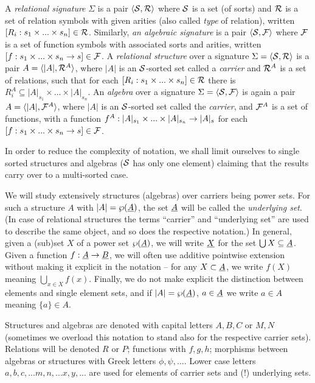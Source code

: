 \documentclass[10pt]{article}
\begin{document}
A {\em relational signature\/}
$\Sigma$ is a pair $\langle{\cal S},{\cal R} \rangle$ where ${\cal S}$ is a set (of sorts)
and ${\cal R}$ is a set of relation symbols with given arities (also called
{\em type} of relation), written
$[R_i:s_1\times...\times s_n]\in {\cal R}$. Similarly, {\em an algebraic
signature\/} is a pair $\langle{\cal S},{\cal F} \rangle$ where 
${\cal F}$ is a set of function symbols with associated sorts and arities,
written $[f:s_1\times...\times s_n\rightarrow s]\in {\cal F}$. 
A {\em relational structure\/} over a signature $\Sigma=\langle{\cal S},{\cal R}\rangle$
is a pair $A= \langle|A|, {\cal R}^A\rangle$, where $|A|$ is
an ${\cal S}$-sorted set called a {\em carrier\/} and ${\cal R}^A$ is a set of
relations, such that for each $[R_i : s_1\times...\times s_n]\in {\cal R}$
there is $R_i^A \subseteq |A|_{s_1}\times...\times |A|_{s_n}$. 
An {\em algebra\/} over a signature $\Sigma=\langle{\cal S},{\cal F}\rangle$ 
is again a pair $A= \langle|A|, {\cal F}^A\rangle$, where $|A|$ is
an ${\cal S}$-sorted set called the {\em carrier}, and ${\cal F}^A$ is a set of
functions, with a function $f^A : |A|_{s_1}\times...\times |A|_{s_n} \rightarrow
|A|_s$ for each $[f : s_1\times...\times s_n\rightarrow s]\in {\cal F}$.

In order to reduce the complexity of notation, we shall limit
ourselves to single sorted structures and algebras 
(${\cal S}$ has only  one element)
claiming that the results carry over to a multi-sorted case. 


We will study extensively structures (algebras) over carriers being
power sets. 
For such a structure $A$ with $|A|=\wp(\underline {A})$, the
set $\underline {A}$ will be called the {\em underlying set}. 
(In case of relational structures the terms ``carrier'' and ``underlying
set'' are used to describe the same object, and so does the respective
notation.)
In general, given a (sub)set $X$ of a power set $\wp(\underline {A})$, 
we will write $\underline {X}$ for the set $\bigcup X\subseteq\underline {A}$. 
Given a function $f:\underline {A}\rightarrow \underline {B}$, we will often use additive pointwise extension
without making it explicit in the notation -- for any $X\subset \underline {A}$, we write
$f(X)$ meaning $\bigcup_{x\in X} f(x)$.
Finally, we do not make explicit the distinction
between elements and single element sets, and if $|A|=\wp(\underline {A})$, $a\in\underline {A}$ we write $a\in A$ meaning $\{a\}\in A$.

Structures and algebras are denoted with capital letters $A,B,C$
or $M,N$ (sometimes we overload this notation to stand also
for the respective carrier sets).
Relations will be denoted $R$ or $P$;
functions with $f,g,h$; morphisms between algebras or structures with
Greek letters $\phi,\psi,...$. Lower case letters $a,b,c,... m,n,... 
x,y,...$ are used for elements of carrier sets and (!) underlying sets. 
\end{document}
